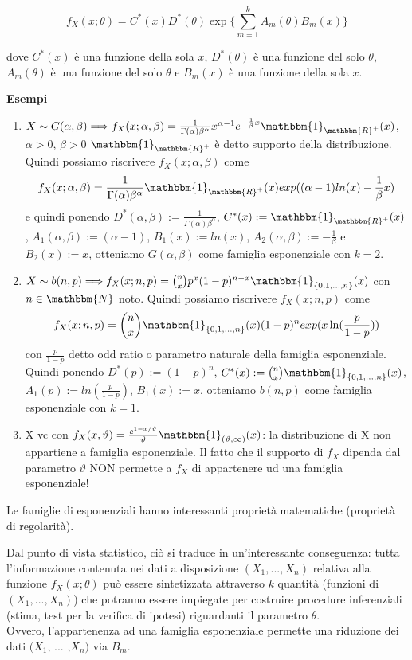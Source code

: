 $$f_X(x;\theta) = C^*(x) D^*(\theta) \exp \lbrace \displaystyle\sum_{m=1}^k A_m(\theta) B_m (x) \rbrace$$

dove $C^*(x)$ è una funzione della sola $x$, $D^*(\theta)$ è una funzione del solo $\theta$, $A_m(\theta)$ è una funzione del solo $\theta$ e $B_m(x)$ è una funzione della sola $x$.

\noindent \textbf{Esempi}
\begin{enumerate}
\item 
$X \sim G(\alpha, \beta) \Longrightarrow f_X(x; \alpha, \beta) = \frac{1}{\Gamma(\alpha) \beta^\alpha} x^{\alpha -1} e^{- \frac{1}{\beta} x} \mathbbm{1}_{\mathbbm{R}^+}(x)$, $\alpha >0$, $\beta >0$
$\mathbbm{1}_{\mathbbm{R}^+}$ è detto supporto della distribuzione.
Quindi possiamo riscrivere $f_X(x; \alpha, \beta)$ come
$$f_X(x; \alpha, \beta) = \frac{1}{\Gamma(\alpha) \beta^\alpha} \mathbbm{1}_{\mathbbm{R}^+}(x) exp((\alpha -1) ln(x) - \frac{1}{\beta} x)$$
e quindi ponendo $D^*(\alpha, \beta) := \frac{1}{\Gamma(\alpha) \beta^\alpha}$, $C^*(x) := \mathbbm{1}_{\mathbbm{R}^+}(x)$, $A_1(\alpha, \beta) := (\alpha -1)$, $B_1(x) := ln(x)$, $A_2(\alpha, \beta) := - \frac{1}{\beta}$ e $B_2(x) := x$, otteniamo $G(\alpha, \beta)$ come famiglia esponenziale con $k=2$.

\item $X \sim b(n,p) \Longrightarrow f_X(x; n,p) = \binom{n}{x} p^x (1-p)^{n-x} \mathbbm{1}_{\lbrace 0,1,...,n \rbrace}(x)$ con $n \in \mathbbm{N}$ noto.
Quindi possiamo riscrivere $f_X(x; n,p)$ come
$$f_X(x; n,p) = \binom{n}{x} \mathbbm{1}_{\lbrace 0,1,...,n \rbrace}(x) (1-p)^n exp(x \ln(\frac{p}{1-p}))$$ con $\frac{p}{1-p}$ detto odd ratio o parametro naturale della famiglia esponenziale.\\
Quindi ponendo $D^*(p) := (1-p)^n$, $C^*(x) := \binom{n}{x} \mathbbm{1}_{\lbrace 0,1,...,n \rbrace}(x)$, $A_1(p) := ln(\frac{p}{1-p})$, $B_1(x) := x$, otteniamo $b(n,p)$ come famiglia esponenziale con $k=1$.

\item X vc con $f_X(x,\vartheta)=\frac{e^{1-x/\vartheta}}{\vartheta}\mathbbm{1}_{(\vartheta,\infty)}(x)$: la distribuzione di X non appartiene a famiglia esponenziale.
Il fatto che il supporto di $f_X$ dipenda dal parametro $\vartheta$ NON permette a $f_X$ di appartenere ud una famiglia esponenziale!
\end{enumerate}

\begin{oss}
Le famiglie di esponenziali hanno interessanti proprietà matematiche (proprietà di regolarità).

Dal punto di vista statistico, ciò si traduce in un'interessante conseguenza: tutta l'informazione contenuta nei dati a disposizione $(X_1,...,X_n)$ relativa alla funzione $f_X (x; \theta)$ può essere sintetizzata attraverso $k$ quantità (funzioni di $(X_1,...,X_n)$) che potranno essere impiegate per costruire procedure inferenziali (stima, test per la verifica di ipotesi) riguardanti il parametro $\theta$.\\
Ovvero, l'appartenenza ad una famiglia esponenziale permette una riduzione dei dati $(X_1$, ... ,$X_n)$ via $B_m$.\end{oss}